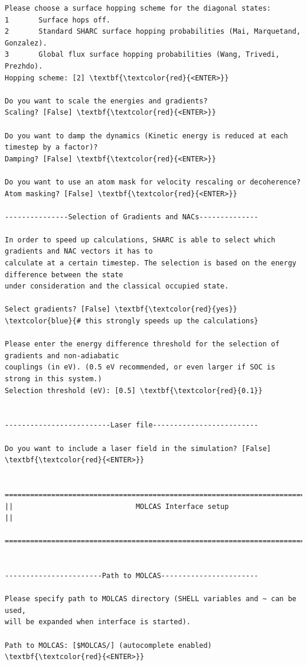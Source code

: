 \documentclass[a4paper,11pt,DIV=15,openany]{scrbook}
\begin{document}
\begin{oframed}
\begin{Verbatim}[commandchars=\\\{\}]
Please choose a surface hopping scheme for the diagonal states:
1       Surface hops off.
2       Standard SHARC surface hopping probabilities (Mai, Marquetand, Gonzalez).
3       Global flux surface hopping probabilities (Wang, Trivedi, Prezhdo).
Hopping scheme: [2] \textbf{\textcolor{red}{<ENTER>}}

Do you want to scale the energies and gradients?
Scaling? [False] \textbf{\textcolor{red}{<ENTER>}}

Do you want to damp the dynamics (Kinetic energy is reduced at each timestep by a factor)?
Damping? [False] \textbf{\textcolor{red}{<ENTER>}}

Do you want to use an atom mask for velocity rescaling or decoherence?
Atom masking? [False] \textbf{\textcolor{red}{<ENTER>}}

---------------Selection of Gradients and NACs--------------

In order to speed up calculations, SHARC is able to select which gradients and NAC vectors it has to 
calculate at a certain timestep. The selection is based on the energy difference between the state 
under consideration and the classical occupied state.

Select gradients? [False] \textbf{\textcolor{red}{yes}}    \textcolor{blue}{# this strongly speeds up the calculations}

Please enter the energy difference threshold for the selection of gradients and non-adiabatic 
couplings (in eV). (0.5 eV recommended, or even larger if SOC is strong in this system.)
Selection threshold (eV): [0.5] \textbf{\textcolor{red}{0.1}}


-------------------------Laser file-------------------------

Do you want to include a laser field in the simulation? [False] \textbf{\textcolor{red}{<ENTER>}}

  ================================================================================
||                             MOLCAS Interface setup                             ||
  ================================================================================


-----------------------Path to MOLCAS-----------------------

Please specify path to MOLCAS directory (SHELL variables and ~ can be used, 
will be expanded when interface is started).

Path to MOLCAS: [$MOLCAS/] (autocomplete enabled) \textbf{\textcolor{red}{<ENTER>}}


\end{Verbatim}
\end{oframed}
\end{document}
